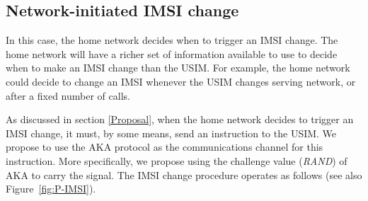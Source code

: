 \documentclass{acm_proc_article-sp}
\begin{document}
\subsection{Network-initiated IMSI change}  \label{HN_Init}  

In this case, the home network decides when to trigger an IMSI change. The home network will have a richer set of information available to use to decide when to make an IMSI change than the USIM\@. For example, the home network could decide to change an IMSI whenever the USIM changes serving network, or after a fixed number of calls. \\


\begin{figure*}
\centering
{}
\caption{IMSI change procedure for predefined multiple IMSIs}
\label{fig:P-IMSI}
\end{figure*}



As discussed in section \ref{Proposal}, when the home network decides to trigger an IMSI change, it must, by some means, send an instruction to the USIM\@. We propose to use the AKA protocol as the communications channel for this instruction. More specifically, we propose using the challenge value (\emph{RAND}) of AKA to carry the signal. The IMSI change procedure operates as follows (see also Figure~\ref{fig:P-IMSI}).
\end{document}
